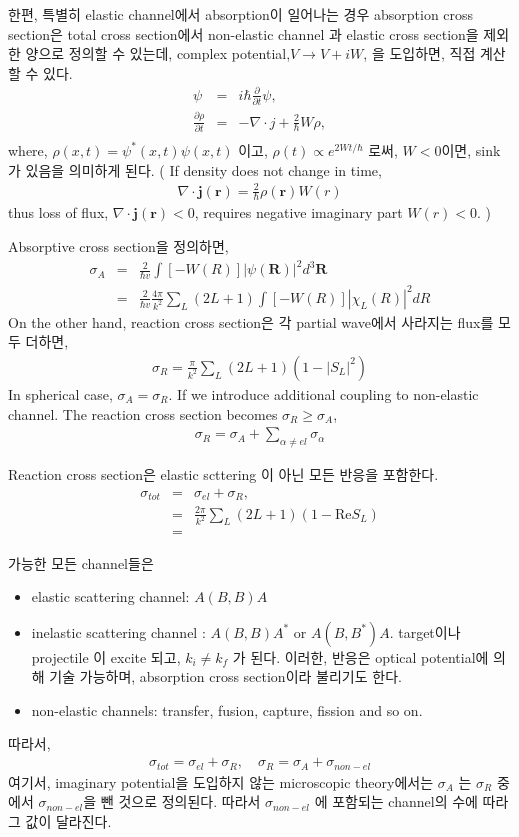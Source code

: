 \documentclass[10pt]{book}
\def\bm{\boldsymbol}
\newcommand{\bea}{\begin{eqnarray}}
\newcommand{\eea}{\end{eqnarray}}
\newcommand{\no}{\nonumber \\}
\newcommand{\del}{\partial}
\def\vr{{\bm r}}
\def\vR{{\bm R}}
\begin{document}
한편, 특별히 elastic channel에서 absorption이 일어나는 경우
absorption cross section은 total cross section에서 non-elastic channel
과 elastic cross section을 제외한 양으로 정의할 수 있는데,
complex potential,$V\to V+ iW$, 을 도입하면, 직접 계산할 수 있다. 
\bea 
[\hat{T}+V+iW]\psi&=&i\hbar\frac{\del}{\del t}\psi, \no 
\frac{\del \rho }{\del t}&=& -\nabla\cdot j +\frac{2}{\hbar} W \rho  ,\no 
\eea 
where, $\rho(x,t)=\psi^*(x,t)\psi(x,t)$ 이고, 
$\rho(t)\propto e^{2W t/\hbar}$ 로써, $W<0$이면, sink 가 있음을 의미하게 된다. 
( If density does not change in time,
\bea 
\nabla\cdot{\bm j}(\vr) = \frac{2}{\hbar}\rho(\vr)W(r)
\eea 
thus loss of flux, $\nabla\cdot{\bm j}(\vr)<0 $, requires negative imaginary part $W(r)<0$. 
)

Absorptive cross section을 정의하면,  
\bea 
\sigma_A &=&\frac{2}{\hbar v}\int [-W(R)]|\psi(\vR)|^2 d^3\vR \no 
         &=&\frac{2}{\hbar v}\frac{4\pi}{k^2}\sum_L (2L+1)
         \int [-W(R)]|\chi_L(R)|^2 dR     
\eea 
On the other hand, reaction cross section은 각 partial wave에서 
사라지는 flux를 모두 더하면,
\bea 
\sigma_R=\frac{\pi}{k^2}\sum_L (2L+1)(1-|S_L|^2)
\eea  
In spherical case, $\sigma_A=\sigma_R$. 
If we introduce additional coupling to non-elastic channel.
The reaction cross section becomes $\sigma_R \geq \sigma_A$,
\bea 
\sigma_R=\sigma_A+\sum_{\alpha\neq el}\sigma_\alpha 
\eea 

Reaction cross section은 elastic scttering 이 아닌 모든 반응을 포함한다. 
\bea
\sigma_{tot}&=&\sigma_{el}+\sigma_R,\no 
            &=&\frac{2\pi}{k^2}\sum_{L} (2L+1)(1-\mbox{Re}S_L)\no 
            &=&
\eea 

가능한 모든 channel들은  
\begin{itemize}
\item  elastic scattering channel: $A(B,B)A$ 
\item  inelastic scattering channel : $A(B,B)A^*$ or $A(B,B^*)A$. 
 target이나 projectile 이 excite 되고, $k_i\neq k_f$ 가 된다. 이러한, 
 반응은 optical potential에 의해 기술 가능하며, absorption cross section이라 불리기도 한다.
\item  non-elastic channels: transfer, fusion, capture, fission and so on. 
\end{itemize}
따라서,
\bea
\sigma_{tot}=\sigma_{el}+\sigma_R,\quad \sigma_R=\sigma_A+\sigma_{non-el}
\eea 
여기서, 
imaginary potential을 도입하지 않는 microscopic theory에서는 
$\sigma_A$ 는 $\sigma_R$ 중에서 $\sigma_{non-el}$을 뺀 것으로 정의된다. 
따라서  $\sigma_{non-el}$ 에 포함되는 channel의 수에 따라 그 값이 달라진다.
\end{document}
